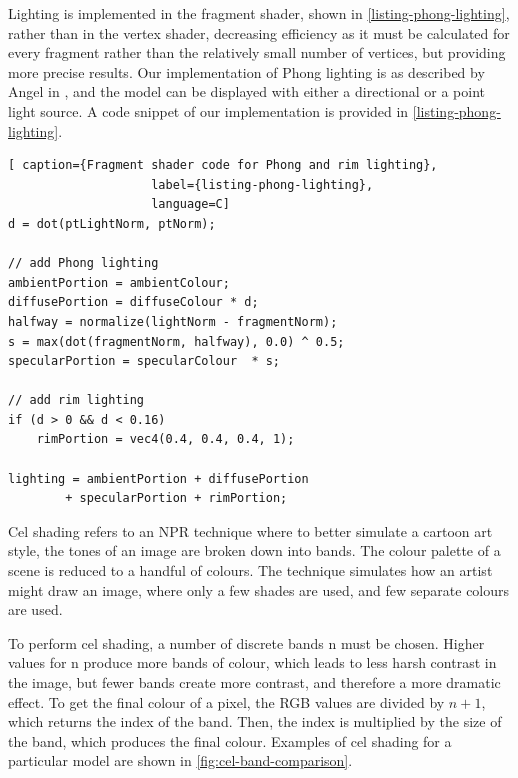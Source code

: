 Lighting is implemented in the fragment shader, shown in \autoref{listing-phong-lighting}, rather than in the vertex shader, decreasing 
efficiency as it must be calculated for every fragment rather than the relatively small number of 
vertices, but providing more precise results. Our implementation of Phong lighting is as described 
by Angel in \cite{texbook}, and the model can be displayed with either a directional or a point light 
source. A code snippet of our implementation is provided in \autoref{listing-phong-lighting}.

\begin{lstlisting}[ caption={Fragment shader code for Phong and rim lighting},
					label={listing-phong-lighting}, 
					language=C]
d = dot(ptLightNorm, ptNorm);

// add Phong lighting
ambientPortion = ambientColour;
diffusePortion = diffuseColour * d;
halfway = normalize(lightNorm - fragmentNorm);
s = max(dot(fragmentNorm, halfway), 0.0) ^ 0.5;
specularPortion = specularColour  * s;

// add rim lighting
if (d > 0 && d < 0.16)
    rimPortion = vec4(0.4, 0.4, 0.4, 1);

lighting = ambientPortion + diffusePortion
        + specularPortion + rimPortion;
\end{lstlisting}

\newpage 
Cel shading refers to an NPR technique where to better simulate a cartoon art style, the tones of 
an image are broken down into bands. The colour palette of a scene is reduced to a handful of colours.
The technique simulates how an artist might draw an image, where only a few shades are used, and few
separate colours are used.

To perform cel shading, a number of discrete bands n must be chosen. Higher values for n produce more 
bands of colour, which leads to less harsh contrast in the image, but fewer bands create more contrast,
and therefore a more dramatic effect. To get the final colour of a pixel, the RGB values are divided by
$n+1$, which returns the index of the band. Then, the index is multiplied by the size of the band, which
produces the final colour. Examples of cel shading for a particular model are shown in 
\autoref{fig:cel-band-comparison}. 

